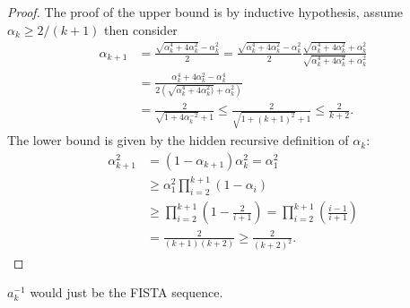 \documentclass[12pt]{article}
\begin{document}
    \begin{proof}
        The proof of the upper bound is by inductive hypothesis, assume $\alpha_k \ge 2/(k + 1)$ then consider
        \begin{align*}
            \alpha_{k + 1} &= 
            \frac{\sqrt{\alpha_k^4 + 4 \alpha_k^2} - \alpha_k^2}{2}
            = 
            \frac{\sqrt{\alpha_k^4 + 4 \alpha_k^2} - \alpha_k^2}{2}
            \frac{\sqrt{\alpha_k^4 + 4 \alpha_k^2} + \alpha_k^2}{\sqrt{\alpha_k^4 + 4 \alpha_k^2} + \alpha_k^2}
            \\
            &= \frac{\alpha_k^4 + 4\alpha_k^2 - \alpha_k^4}{2(\sqrt{\alpha_k^4 + 4 \alpha_k^2)} + \alpha_k^2)}
            \\
            &= \frac{2}{\sqrt{1 + 4 \alpha_k^{-2}} + 1} 
            \le \frac{2}{\sqrt{1 + (k + 1)^2} + 1} \le \frac{2}{k + 2}. 
        \end{align*}
        The lower bound is given by the hidden recursive definition of $\alpha_k$: 
        \begin{align*}
            \alpha_{k + 1}^2 &= (1 - \alpha_{k + 1})\alpha_k^2 = \alpha_1^2
            \\
            &\ge \alpha_1^2 \prod_{i = 2}^{k + 1}(1 - \alpha_i)
            \\
            &\ge \prod_{i = 2}^{k + 1}\left(
                1 - \frac{2}{i + 1}
            \right) = \prod_{i = 2}^{k + 1} \left(\frac{i - 1}{i + 1}\right)
            \\
            &= \frac{2}{(k + 1)(k + 2)}  \ge \frac{2}{(k + 2)^2}. 
        \end{align*}
    \end{proof}
    \begin{remark}
        $a_k^{-1}$ would just be the FISTA sequence. 
    \end{remark}
\end{document}
